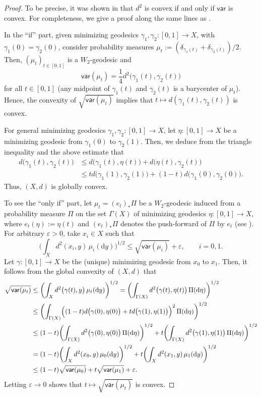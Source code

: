 \documentclass[a4paper,11pt]{article}
\numberwithin{equation}{section}
\theoremstyle{definition}
\theoremstyle{plain}
\newcommand{\lra}{\longrightarrow}
\newcommand{\ve}{\varepsilon}
\newcommand{\dd}{\mathrm{d}}
\newcommand{\var}{\mathsf{var}}
\begin{document}
\begin{proof}
To be precise, it was shown in \cite[Proposition~2.1]{KP} that $d^2$ is convex if and only if $\var$ is convex.
For completeness, we give a proof along the same lines as \cite{KP}.

In the ``if'' part, given minimizing geodesics $\gamma_1,\gamma_2 \colon [0,1] \lra X$, with $\gamma_1(0)=\gamma_2(0)$,
consider probability measures $\mu_t:=(\delta_{\gamma_1(t)}+\delta_{\gamma_2(t)})/2$.
Then, $(\mu_t)_{t \in [0,1]}$ is a $W_2$-geodesic and
\[ \var(\mu_t) =\frac{1}{4}d^2 \bigl( \gamma_1(t),\gamma_2(t) \bigr) \]
for all $t \in [0,1]$ (any midpoint of $\gamma_1(t)$ and $\gamma_2(t)$ is a barycenter of $\mu_t$).
Hence, the convexity of $\sqrt{\var(\mu_t)}$ implies that $t \longmapsto d(\gamma_1(t),\gamma_2(t))$ is convex.

For general minimizing geodesics $\gamma_1,\gamma_2 \colon [0,1] \lra X$, let $\eta\colon [0,1] \lra X$ be a minimizing geodesic from $\gamma_1(0)$ to $\gamma_2(1)$.
Then, we deduce from the triangle inequality and the above estimate that
\begin{align*}
d\bigl( \gamma_1(t),\gamma_2(t) \bigr)
&\le d\bigl( \gamma_1(t),\eta(t) \bigr) +d\bigl( \eta(t),\gamma_2(t) \bigr) \\
&\le td\bigl( \gamma_1(1),\gamma_2(1) \bigr) +(1-t)d\bigl( \gamma_1(0),\gamma_2(0) \bigr).
\end{align*}
Thus, $(X,d)$ is globally convex.

To see the ``only if'' part, let $\mu_t =(e_t)_* \Pi$ be a $W_2$-geodesic induced from a probability measure $\Pi$ on the set $\Gamma(X)$ of minimizing geodesics $\eta\colon [0,1] \lra X$,
where $e_t(\eta):=\eta(t)$ and $(e_t)_* \Pi$ denotes the push-forward of $\Pi$ by $e_t$
(see \cite[Theorem~6]{Li}).
For arbitrary $\ve>0$, take $x_i \in X$ such that
\[ \biggl( \int_X d^2(x_i,y) \,\mu_i(\dd y) \biggr)^{1/2} \le \sqrt{\var(\mu_i)} +\ve, \qquad i=0,1. \]
Let $\gamma\colon [0,1] \lra X$ be the (unique) minimizing geodesic from $x_0$ to $x_1$.
Then, it follows from the global convexity of $(X,d)$ that
\begin{align*}
\sqrt{\var(\mu_t)} &\le \biggl( \int_X d^2\bigl( \gamma(t),y \bigr) \,\mu_t(\dd y) \biggr)^{1/2}
 =\biggl( \int_{\Gamma(X)} d^2\bigl( \gamma(t),\eta(t) \bigr) \,\Pi(\dd\eta) \biggr)^{1/2} \\
&\le \biggl( \int_{\Gamma(X)} \Bigl( (1-t)d\bigl( \gamma(0),\eta(0) \bigr) +td\bigl( \gamma(1),\eta(1) \bigr) \Bigr)^2 \,\Pi(\dd\eta) \biggr)^{1/2} \\
&\le (1-t) \biggl( \int_{\Gamma(X)} d^2\bigl( \gamma(0),\eta(0) \bigr) \,\Pi(\dd\eta) \biggr)^{1/2}
 +t \biggl( \int_{\Gamma(X)} d^2\bigl( \gamma(1),\eta(1) \bigr) \,\Pi(\dd\eta) \biggr)^{1/2} \\
&= (1-t) \biggl( \int_X d^2(x_0,y) \,\mu_0(\dd y) \biggr)^{1/2} +t \biggl( \int_X d^2(x_1,y) \,\mu_1(\dd y) \biggr)^{1/2} \\
&\le (1-t)\sqrt{\var(\mu_0)} +t\sqrt{\var(\mu_1)} +\ve.
\end{align*}
Letting $\ve \to 0$ shows that $t \longmapsto \sqrt{\var(\mu_t)}$ is convex.
\end{proof}
\end{document}
